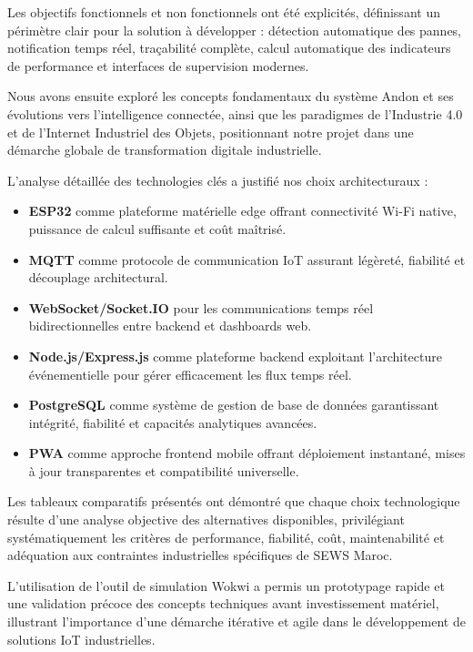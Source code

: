 Les objectifs fonctionnels et non fonctionnels ont été explicités, définissant un périmètre clair pour la solution à développer : détection automatique des pannes, notification temps réel, traçabilité complète, calcul automatique des indicateurs de performance et interfaces de supervision modernes.

Nous avons ensuite exploré les concepts fondamentaux du système Andon et ses évolutions vers l'intelligence connectée, ainsi que les paradigmes de l'Industrie 4.0 et de l'Internet Industriel des Objets, positionnant notre projet dans une démarche globale de transformation digitale industrielle.

L'analyse détaillée des technologies clés a justifié nos choix architecturaux :

\begin{itemize}
    \item \textbf{ESP32} comme plateforme matérielle edge offrant connectivité Wi-Fi native, puissance de calcul suffisante et coût maîtrisé.
    \item \textbf{MQTT} comme protocole de communication IoT assurant légèreté, fiabilité et découplage architectural.
    \item \textbf{WebSocket/Socket.IO} pour les communications temps réel bidirectionnelles entre backend et dashboards web.
    \item \textbf{Node.js/Express.js} comme plateforme backend exploitant l'architecture événementielle pour gérer efficacement les flux temps réel.
    \item \textbf{PostgreSQL} comme système de gestion de base de données garantissant intégrité, fiabilité et capacités analytiques avancées.
    \item \textbf{PWA} comme approche frontend mobile offrant déploiement instantané, mises à jour transparentes et compatibilité universelle.
\end{itemize}


Les tableaux comparatifs présentés ont démontré que chaque choix technologique résulte d'une analyse objective des alternatives disponibles, privilégiant systématiquement les critères de performance, fiabilité, coût, maintenabilité et adéquation aux contraintes industrielles spécifiques de SEWS Maroc.

L'utilisation de l'outil de simulation Wokwi a permis un prototypage rapide et une validation précoce des concepts techniques avant investissement matériel, illustrant l'importance d'une démarche itérative et agile dans le développement de solutions IoT industrielles.

